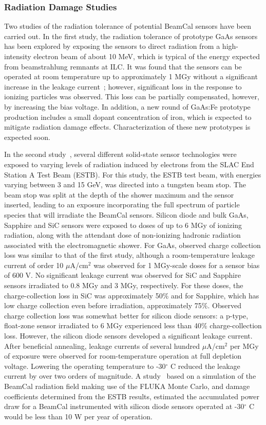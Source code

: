 \subsubsection{Radiation Damage Studies}

Two studies of the radiation tolerance of potential BeamCal sensors have
been carried out.
In the first study, the radiation tolerance of prototype GaAs sensors
has been explored by
exposing the sensors to direct radiation from a high-intensity electron
beam of
about 10 MeV, which is typical of the energy expected from
beamstrahlung
remnants at ILC. It was found that the sensors can be operated at
room temperature up
to approximately 1 MGy without a significant increase in the
leakage current~\cite{1748-0221-7-11-P11022}; however, significant loss
in the response
to ionizing particles was observed. This loss can be partially
compensated, however,
by increasing the bias voltage. In addition, a new round of GaAs:Fe
prototype production
includes a small dopant concentration of iron, which is expected to mitigate
radiation damage effects. Characterization of these new prototypes is
expected soon.

In the second study~\cite{Anderson:2017kkq}, several different
solid-state sensor
technologies were
exposed to varying levels of radiation induced by electrons from the
SLAC End Station A
Test Beam (ESTB).
For this study, the ESTB test beam, with energies varying between 3
and 15 GeV, was
directed into a tungsten beam stop. The beam stop was split at the depth
of the shower maximum
and the sensor inserted,
leading to an exposure incorporating the full spectrum of particle
species that will
irradiate the BeamCal sensors. Silicon diode and bulk GaAs, Sapphire and
SiC sensors
were exposed to doses of up to 6 MGy of ionizing radiation, along with the
attendant dose of non-ionizing hadronic radiation associated with the
electromagnetic
shower. For GaAs, observed charge collection loss was similar to that of
the first study, although a room-temperature leakage current of
order 10 $\mu$A/cm$^2$
was observed for 1 MGy-scale doses for a sensor
bias of 600 V. No significant leakage current was observed for SiC
and Sapphire sensors
irradiated to 0.8 MGy and 3 MGy, respectively. For these doses, the
charge-collection
loss in SiC was approximately 50\% and for Sapphire, which has low
charge collection
even before irradiation, approximately 75\%. Observed charge
collection loss was
somewhat better for silicon diode sensors: a p-type, float-zone sensor
irradiated
to 6 MGy experienced less than 40\% charge-collection loss. However, the silicon
diode sensors developed a significant leakage current. After
beneficial annealing, leakage currents of several hundred $\mu$A/cm$^2$
per MGy of exposure were observed for room-temperature operation at full
depletion
voltage. Lowering the operating temperature to -30$^\circ$ C reduced
the leakage
current by over two orders of magnitude.
A study~\cite{Schumm:2018phi}
based on a simulation of the BeamCal radiation field
making use of the FLUKA Monte Carlo\cite{Bohlen:2014buj,Ferrari:2005zk}, and damage coefficients
determined from the ESTB results, estimated the accumulated power draw
for a BeamCal instrumented with silicon diode sensors operated
at -30$^\circ$ C
would be less than 10 W per year of operation.

